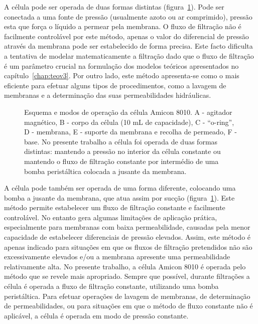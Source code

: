 A célula pode ser operada de duas formas distintas (figura~\ref{fig:amicon}). Pode ser conectada a uma fonte de pressão (usualmente azoto ou ar comprimido), pressão esta que força o líquido a permear pela membrana. O fluxo de filtração não é facilmente controlável por este método, apenas o valor do diferencial de pressão através da membrana pode ser estabelecido de forma precisa. Este facto dificulta a tentativa de modelar matematicamente a filtração dado que o fluxo de filtração é um parâmetro crucial na formulação dos modelos teóricos apresentados no capítulo~\ref{chap:teov3}. Por outro lado, este método apresenta-se como o mais eficiente para efetuar alguns tipos de procedimentos, como a lavagem de membranas e a determinação das suas permeabilidades hidráulicas.
\begin{figure}
\centering

\caption[Esquema e modos de operação da célula Amicon 8010]{Esquema e modos de operação da célula Amicon 8010. A - agitador magnético, B - corpo da célula (10 mL de capacidade), C - ``o-ring'', D - membrana, E - suporte da membrana e recolha de permeado, F - base. No presente trabalho a célula foi operada de duas formas distintas: mantendo a pressão no interior da célula constante ou mantendo o fluxo de filtração constante por intermédio de uma bomba peristáltica colocada a jusante da membrana.}
\label{fig:amicon}
\end{figure}
A célula pode também ser operada de uma forma diferente, colocando uma bomba a jusante da membrana, que atua assim por sucção (figura~\ref{fig:amicon}). Este método permite estabelecer um fluxo de filtração constante e facilmente controlável. No entanto gera algumas limitações de aplicação prática, especialmente para membranas com baixa permeabilidade, causadas pela menor capacidade de estabelecer diferenciais de pressão elevados. Assim, este método é apenas indicado para situações em que os fluxos de filtração pretendidos não são excessivamente elevados e/ou a membrana apresente uma permeabilidade relativamente alta. No presente trabalho, a célula Amicon 8010 é operada pelo método que se revele mais apropriado. Sempre que possível, durante filtrações a célula é operada a fluxo de filtração constante, utilizando uma bomba peristáltica. Para efetuar operações de lavagem de membranas, de determinação de permeabilidades, ou para situações em que o método de fluxo constante não é aplicável, a célula é operada em modo de pressão constante.

